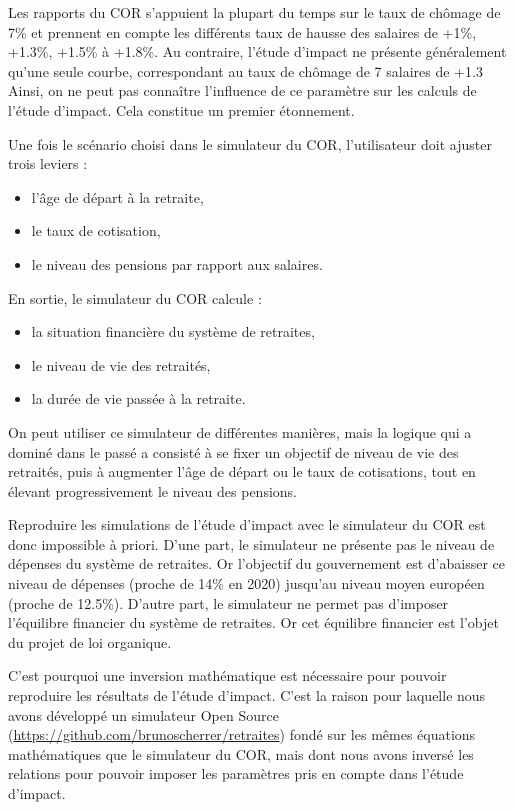 \documentclass[10pt]{article}
\begin{document}
Les rapports du COR s'appuient la plupart du temps sur le taux 
de chômage de 7\% et prennent en compte les différents taux de hausse 
des salaires de +1\%, +1.3\%, +1.5\% à +1.8\%. 
Au contraire, l'étude d'impact ne présente généralement qu'une seule 
courbe, correspondant au taux de chômage de 7%
salaires de +1.3%
Ainsi, on ne peut pas connaître l'influence de ce paramètre sur les calculs 
de l'étude d'impact. 
Cela constitue un premier étonnement. 

Une fois le scénario choisi dans le simulateur du COR, 
l'utilisateur doit ajuster trois leviers : 
\begin{itemize}
\item l'âge de départ à la retraite, 
\item le taux de cotisation, 
\item le niveau des pensions par rapport aux salaires. 
\end{itemize}

En sortie, le simulateur du COR calcule :
\begin{itemize}
\item la situation financière du système de retraites, 
\item le niveau de vie des retraités, 
\item la durée de vie passée à la retraite. 
\end{itemize}

On peut utiliser ce simulateur de différentes manières, mais la 
logique qui a dominé dans le passé a consisté à se fixer un objectif 
de niveau de vie des retraités, puis à augmenter l'âge de départ ou 
le taux de cotisations, tout en élevant progressivement le niveau des pensions. 

Reproduire les simulations de l'étude d'impact avec le simulateur du COR 
est donc impossible à priori. 
D'une part, le simulateur ne présente pas le niveau de dépenses du système 
de retraites. 
Or l'objectif du gouvernement est d'abaisser ce niveau de dépenses 
(proche de 14\% en 2020) jusqu'au niveau moyen européen (proche de 12.5\%). 
D'autre part, le simulateur ne permet pas d'imposer l'équilibre financier du système 
de retraites. 
Or cet équilibre financier est l'objet du projet de loi organique. 

C'est pourquoi une inversion mathématique est nécessaire pour pouvoir reproduire 
les résultats de l'étude d'impact. 
C'est la raison pour laquelle nous avons développé un simulateur Open Source 
(\url{https://github.com/brunoscherrer/retraites}) fondé sur les mêmes équations mathématiques 
que le simulateur du COR, mais dont nous avons inversé les relations pour 
pouvoir imposer les paramètres pris en compte dans l'étude d'impact. 
\end{document}
